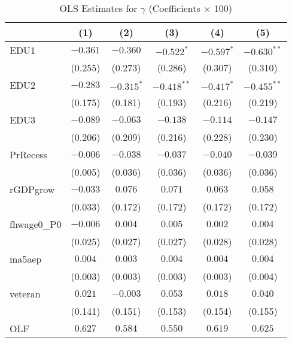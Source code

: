 \documentclass[12pt]{article}
\begin{document}
\begin{table}[H]
\centering
\caption{OLS Estimates for $\gamma$ (Coefficients $\times$ 100)}

\begin{tabular}{lccccc}

\toprule
                    & (1)     & (2)   & (3)    & (4)      & (5)         \\
\midrule
EDU1                & $-0.361$  & $-0.360$    & $-0.522^{*}$  & $-0.597^{*}$   & $-0.630^{**}$    \\
                    & (0.255)   & (0.273)     & (0.286)   & (0.307)    & (0.310)     \\
EDU2                & $-0.283$  & $-0.315^{*}$    & $-0.418^{**}$  & $-0.417^{*}$   & $-0.455^{**}$    \\
                    & (0.175)   & (0.181)     & (0.193)   & (0.216)    & (0.219)     \\
EDU3                & $-0.089$  & $-0.063$    & $-0.138$  & $-0.114$   & $-0.147$    \\
                    & (0.206)   & (0.209)     & (0.216)   & (0.228)    & (0.230)     \\
PrRecess            & $-0.006$   & $-0.038$     & $-0.037$   & $-0.040$    & $-0.039$     \\
                    & (0.005)   & (0.036)     & (0.036)   & (0.036)    & (0.036)     \\
rGDPgrow            & $-0.033$   & $0.076$     & $0.071$   & $0.063$    & $0.058$     \\
                    & (0.033)   & (0.172)     & (0.172)   & (0.172)    & (0.172)     \\
fhwage0\_P0         & $-0.006$   & $0.004$     & $0.005$   & $0.002$    & $0.004$     \\
                    & (0.025)   & (0.027)     & (0.027)   & (0.028)    & (0.028)     \\
ma5aep              & $0.004$   & $0.003$     & $0.004$   & $0.004$    & $0.004$     \\
                    & (0.003)   & (0.003)     & (0.003)   & (0.003)    & (0.004)     \\
veteran             & $0.021$   & $-0.003$     & $0.053$   & $0.018$    & $0.040$     \\
                    & (0.141)   & (0.151)     & (0.153)   & (0.154)    & (0.155)     \\
OLF                 & $0.627$   & $0.584$     & $0.550$   & $0.619$    & $0.625$     \\

\end{tabular}
\end{table}
\end{document}
